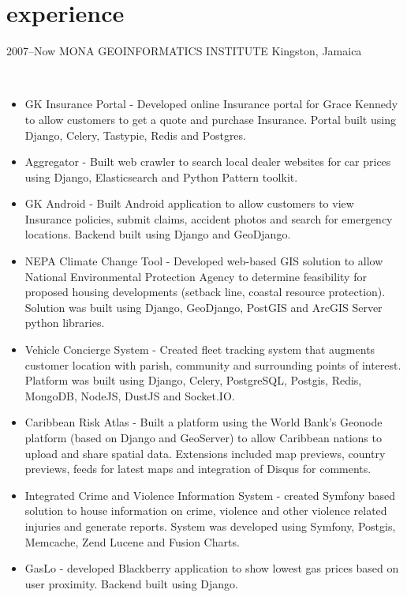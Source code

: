 \documentclass[]{cv-style}          %
\begin{document}
\section{experience}

\begin{entrylist}
\entry
  {2007--Now}
  {MONA GEOINFORMATICS INSTITUTE}
  {Kingston, Jamaica}
  {\\  
\begin{itemize}
\item GK Insurance Portal - Developed online Insurance portal for Grace Kennedy to allow customers to get a quote and purchase Insurance. Portal built using Django, Celery, Tastypie, Redis and Postgres.
\item Aggregator - Built web crawler to search local dealer websites for car prices using Django, Elasticsearch and Python Pattern toolkit. 
\item GK Android - Built Android application to allow customers to view Insurance policies, submit claims, accident photos and search for emergency locations. Backend built using Django and GeoDjango.
\item NEPA Climate Change Tool - Developed web-based GIS solution to allow National Environmental Protection Agency to determine feasibility for proposed housing developments (setback line, coastal resource protection). Solution was built using Django, GeoDjango, PostGIS and ArcGIS Server python libraries.
\item Vehicle Concierge System - Created fleet tracking system that augments customer location with parish, community and surrounding points of interest. Platform was built using Django, Celery, PostgreSQL, Postgis, Redis, MongoDB, NodeJS, DustJS and Socket.IO. 
\item Caribbean Risk Atlas - Built a platform using the World Bank's Geonode platform (based on Django and GeoServer) to allow Caribbean nations to upload and share spatial data. Extensions included map previews, country previews, feeds for latest maps and integration of Disqus for comments.
\item Integrated Crime and Violence Information System - created Symfony based solution to house information on crime, violence and other violence related injuries and generate reports. System was developed using Symfony, Postgis, Memcache, Zend Lucene and Fusion Charts.
\item GasLo - developed Blackberry  application  to  show  lowest  gas  prices  based  on  user proximity. Backend built using Django.

\end{itemize}}
\end{entrylist}
\end{document}
